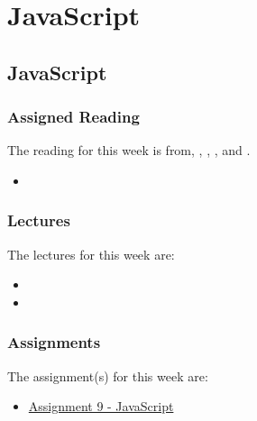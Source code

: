\clearpage

\renewcommand{\ChapTitle}{JavaScript}
\renewcommand{\SectionTitle}{JavaScript}

\chapter{\ChapTitle}

\section{\SectionTitle}

\subsection{Assigned Reading}

The reading for this week is from, \AgileBook, \EngSoftBook, \ProGitBook, and \LinuxBook.

\begin{itemize}
    \item {}
\end{itemize}

\subsection{Lectures}

The lectures for this week are:

\begin{itemize}
    \item {}
    \item {}
\end{itemize}

\subsection{Assignments}

The assignment(s) for this week are:

\begin{itemize}
    \item \href{https://github.com/QuantumCompiler/CU/tree/main/CSPB%203308%20-%20Software%20Development%20Methods%20And%20Tools/Assignments/Assignment%209%20-%20JavaScript}{Assignment 9 - JavaScript}
\end{itemize}

